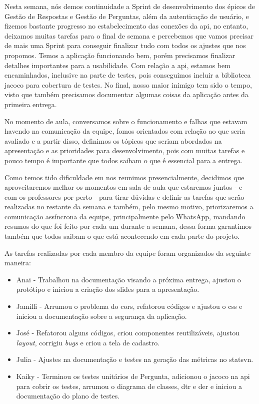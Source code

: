 Nesta semana, nós demos continuidade a \gls{Sprint} de desenvolvimento dos épicos de Gestão de Respostas e Gestão de Perguntas, além da autenticação de usuário, e fizemos bastante progresso no estabelecimento das conexões da \acs{api}, no entanto, deixamos muitas tarefas para o final de semana e percebemos que vamos precisar de mais uma \gls{Sprint} para conseguir finalizar tudo com todos os ajustes que nos propomos. Temos a aplicação funcionando bem, porém precisamos finalizar detalhes importantes para a usabilidade. Com relação a \acs{api}, estamos bem encaminhados, inclusive na parte de testes, pois conseguimos incluir a biblioteca \acs{jacoco} para cobertura de testes. No final, nosso maior inimigo tem sido o tempo, visto que também precisamos documentar algumas coisas da aplicação antes da primeira entrega.

No momento de aula, conversamos sobre o funcionamento e falhas que estavam havendo na comunicação da equipe, fomos orientados com relação ao que seria avaliado e a partir disso, definimos os tópicos que seriam abordados na apresentação e as prioridades para desenvolvimento, pois com muitas tarefas e pouco tempo é importante que todos saibam o que é essencial para a entrega.

Como temos tido dificuldade em nos reunimos presencialmente, decidimos que aproveitaremos melhor os momentos em sala de aula que estaremos juntos - e com os professores por perto - para tirar dúvidas e definir as tarefas que serão realizadas no restante da semana e também, pelo mesmo motivo, priorizaremos a comunicação assíncrona da equipe, principalmente pelo \gls{WhatsApp}, mandando resumos do que foi feito por cada um durante a semana, dessa forma garantimos também que todos saibam o que está acontecendo em cada parte do projeto.

As tarefas realizadas por cada membro da equipe foram organizados da seguinte maneira:
\begin{itemize}
    \item Anai - Trabalhou na documentação visando a próxima entrega, ajustou o protótipo e iniciou a criação dos slides para a apresentação. 
    \item Jamilli - Arrumou o problema do \acs{cors}, refatorou códigos e ajustou o \acs{css} e iniciou a documentação sobre a segurança da aplicação.
    \item José - Refatorou alguns códigos, criou componentes reutilizáveis, ajustou \textit{layout}, corrigiu \textit{bugs} e criou a tela de cadastro.
    \item Julia - Ajustes na documentação e testes na geração das métricas no \gls{statsvn}.
    \item Kaiky - Terminou os testes unitários de Pergunta, adicionou o \acs{jacoco} na \acs{api} para cobrir os testes, arrumou o diagrama de classes, \acs{dtr} e \acs{der} e iniciou a documentação do plano de testes.
\end{itemize}

